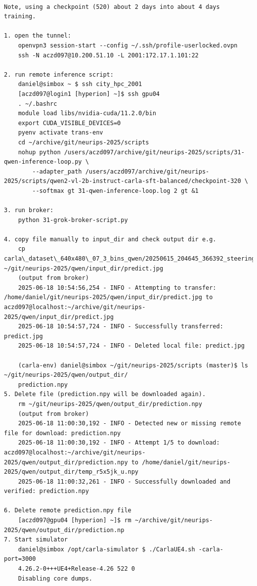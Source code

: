 \begin{verbatim}

Note, using a checkpoint (520) about 2 days into about 4 days training.

1. open the tunnel:
    openvpn3 session-start --config ~/.ssh/profile-userlocked.ovpn
    ssh -N aczd097@10.200.51.10 -L 2001:172.17.1.101:22
    
2. run remote inference script:
    daniel@simbox ~ $ ssh city_hpc_2001
    [aczd097@login1 [hyperion] ~]$ ssh gpu04
    . ~/.bashrc
    module load libs/nvidia-cuda/11.2.0/bin
    export CUDA_VISIBLE_DEVICES=0
    pyenv activate trans-env
    cd ~/archive/git/neurips-2025/scripts
    nohup python /users/aczd097/archive/git/neurips-2025/scripts/31-qwen-inference-loop.py \
        --adapter_path /users/aczd097/archive/git/neurips-2025/scripts/qwen2-vl-2b-instruct-carla-sft-balanced/checkpoint-320 \
        --softmax gt 31-qwen-inference-loop.log 2 gt &1
        
3. run broker:
    python 31-grok-broker-script.py 
    
4. copy file manually to input_dir and check output dir e.g.
    cp carla\_dataset\_640x480\_07_3_bins_qwen/20250615_204645_366392_steering_0.0000.jpg ~/git/neurips-2025/qwen/input_dir/predict.jpg
    (output from broker)
    2025-06-18 10:54:56,254 - INFO - Attempting to transfer: /home/daniel/git/neurips-2025/qwen/input_dir/predict.jpg to aczd097@localhost:~/archive/git/neurips-2025/qwen/input_dir/predict.jpg
    2025-06-18 10:54:57,724 - INFO - Successfully transferred: predict.jpg
    2025-06-18 10:54:57,724 - INFO - Deleted local file: predict.jpg
    
    (carla-env) daniel@simbox ~/git/neurips-2025/scripts (master)$ ls ~/git/neurips-2025/qwen/output_dir/
    prediction.npy
5. Delete file (prediction.npy will be downloaded again).
    rm ~/git/neurips-2025/qwen/output_dir/prediction.npy
    (output from broker)
    2025-06-18 11:00:30,192 - INFO - Detected new or missing remote file for download: prediction.npy
    2025-06-18 11:00:30,192 - INFO - Attempt 1/5 to download: aczd097@localhost:~/archive/git/neurips-2025/qwen/output_dir/prediction.npy to /home/daniel/git/neurips-2025/qwen/output_dir/temp_r5x5jk_u.npy
    2025-06-18 11:00:32,261 - INFO - Successfully downloaded and verified: prediction.npy

6. Delete remote prediction.npy file
    [aczd097@gpu04 [hyperion] ~]$ rm ~/archive/git/neurips-2025/qwen/output_dir/prediction.np
7. Start simulator
    daniel@simbox /opt/carla-simulator $ ./CarlaUE4.sh -carla-port=3000
    4.26.2-0+++UE4+Release-4.26 522 0
    Disabling core dumps.


\end{verbatim}
